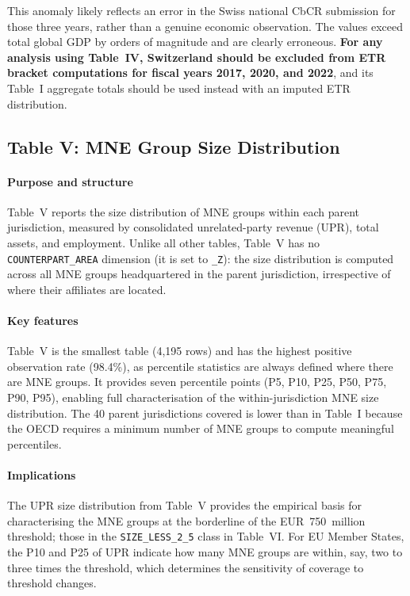 \documentclass[11pt,a4paper]{article}
\newcommand{\code}[1]{\texttt{#1}}
\begin{document}
This anomaly likely reflects an error in the Swiss national CbCR submission for
those three years, rather than a genuine economic observation. The values exceed
total global GDP by orders of magnitude and are clearly erroneous. \textbf{For any
analysis using Table~IV, Switzerland should be excluded from ETR bracket
computations for fiscal years 2017, 2020, and 2022}, and its Table~I aggregate
totals should be used instead with an imputed ETR distribution.

\subsection{Table V: MNE Group Size Distribution}\label{sec:table5}

\paragraph{Purpose and structure}
Table~V reports the size distribution of MNE groups within each parent jurisdiction, measured by consolidated unrelated-party revenue (UPR), total assets, and employment. Unlike all other tables, Table~V has no \code{COUNTERPART\_AREA} dimension (it is set to \code{\_Z}): the size distribution is computed across all MNE groups headquartered in the parent jurisdiction, irrespective of where their affiliates are located.

\paragraph{Key features}
Table~V is the smallest table (4,195 rows) and has the highest positive observation rate (98.4\%), as percentile statistics are always defined where there are MNE groups. It provides seven percentile points (P5, P10, P25, P50, P75, P90, P95), enabling full characterisation of the within-jurisdiction MNE size distribution. The 40 parent jurisdictions covered is lower than in Table~I because the OECD requires a minimum number of MNE groups to compute meaningful percentiles.

\paragraph{Implications}
The UPR size distribution from Table~V provides the empirical basis for characterising the MNE groups at the borderline of the EUR~750~million threshold; those in the \code{SIZE\_LESS\_2\_5} class in Table~VI. For EU Member States, the P10 and P25 of UPR indicate how many MNE groups are within, say, two to three times the threshold, which determines the sensitivity of coverage to threshold changes.
\end{document}
